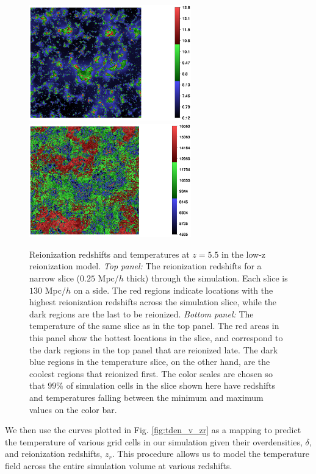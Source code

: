 \begin{figure}[t]
\bc
\includegraphics[width=7cm]{f3a.ps}
\includegraphics[width=7cm]{f3b.ps}
\caption{Reionization redshifts and temperatures at $z=5.5$ in the low-z reionization model.
{\em Top panel:} The reionization redshifts for a narrow slice ($0.25$ Mpc/$h$ thick) through
the simulation. Each slice is $130$ Mpc/$h$ on a side. The red regions indicate locations with the highest reionization redshifts across
the simulation slice, while the dark regions are the last to be reionized. {\em Bottom panel:}
The temperature of the same slice as in the top panel. The red areas in this panel show the
hottest locations in the slice, and correspond to the dark regions in the top panel that
are reionized late. The dark blue regions in the temperature slice, on the other hand, are the coolest regions that reionized
first. The color scales are chosen so that $99\%$ of simulation cells in the slice shown here have redshifts and temperatures falling 
between the minimum and maximum values on the color bar.}
\label{fig:tslice_lowz}
\ec
\end{figure}

We then use the curves plotted in Fig. \ref{fig:tden_v_zr} as a mapping to predict the temperature of various grid cells in our
simulation given their overdensities, $\delta$, and reionization redshifts, $z_r$. This procedure allows us to model the temperature
field across the entire simulation volume at various redshifts. 

